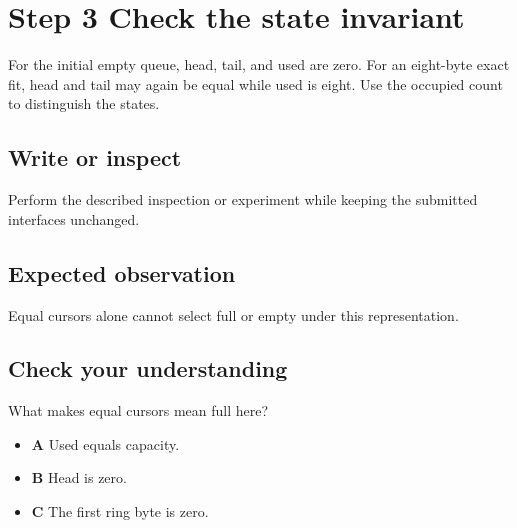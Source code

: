 \section{Step 3 Check the state invariant}\label{ring-s03}

For the initial empty queue, head, tail, and used are zero. For an eight-byte exact fit, head and tail may again be equal while used is eight. Use the occupied count to distinguish the states.

\subsection{Write or inspect}
Perform the described inspection or experiment while keeping the submitted interfaces unchanged.

\subsection{Expected observation}
Equal cursors alone cannot select full or empty under this representation.

\subsection{Check your understanding}
What makes equal cursors mean full here?

\begin{itemize}
  \item \textbf{A} Used equals capacity.
  \item \textbf{B} Head is zero.
  \item \textbf{C} The first ring byte is zero.
\end{itemize}
